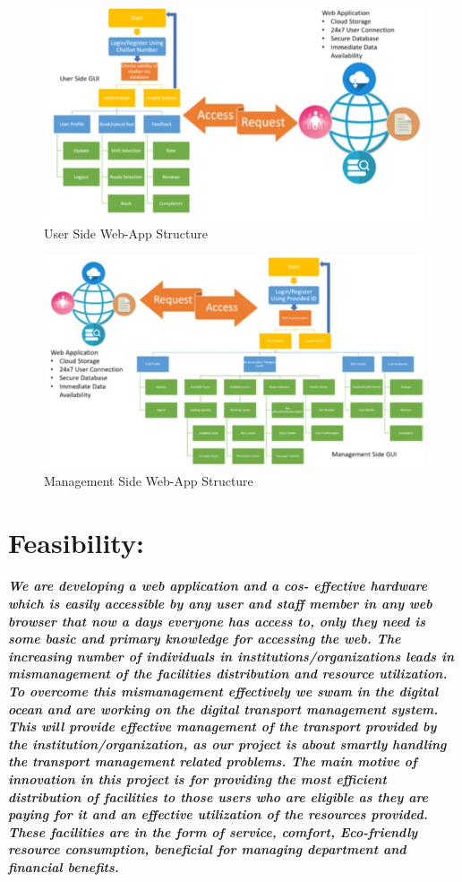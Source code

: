 \documentclass[]{article}
\begin{document}
\begin{figure}[h]
	\centering
	\includegraphics{user}
	\caption{User Side Web-App Structure}

\end{figure}
\begin{figure}[h]
	\centering
	\includegraphics{management}
	\caption{Management Side Web-App Structure}

\end{figure}

\section{Feasibility:}
\subparagraph{We are developing a web application and a cos- effective hardware which is easily accessible by any user and staff member in any web browser that now a days everyone has access to, only they need is some basic and primary knowledge for accessing the web. The increasing number of individuals in institutions/organizations leads in mismanagement of the facilities distribution and resource utilization. To overcome this mismanagement effectively we swam in the digital ocean and are working on the digital transport management system. This will provide effective management of the transport provided by the institution/organization, as our project is about smartly handling the transport management related problems. The main motive of innovation in this project is for providing the most efficient distribution of facilities to those users who are eligible as they are paying for it and an effective utilization of the resources provided. These facilities are in the form of service, comfort, Eco-friendly resource consumption, beneficial for managing department and financial benefits.}
\end{document}
